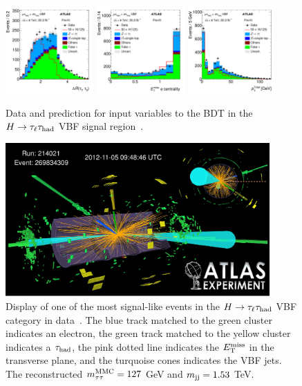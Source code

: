 \begin{figure}[tp]
  \includegraphics[width=0.30\textwidth]{figures/HIGG-2013-32/figaux_06f}
  \includegraphics[width=0.30\textwidth]{figures/HIGG-2013-32/figaux_07a}
  \includegraphics[width=0.30\textwidth]{figures/HIGG-2013-32/figaux_07b}
  \caption{Data and prediction for input variables to the BDT in the $H\rightarrow\tau_\ell\tau_\text{had}$ VBF signal region~\cite{HIGG-2013-32}.}
  \label{fig:results-SR-inputs}
\end{figure}

\clearpage

\begin{figure}[tp]
  \centering
  \includegraphics[width=0.90\textwidth]{figures/HIGG-2013-32/figaux_19}
  \caption{Display of one of the most signal-like events in the $H\rightarrow\tau_\ell\tau_\text{had}$ VBF category in data~\cite{HIGG-2013-32}. The blue track matched to the green cluster indicates an electron, the green track matched to the yellow cluster indicates a $\tau_\text{had}$, the pink dotted line indicates the $E_{\mathrm{T}}^{\mathrm{miss}}$ in the transverse plane, and the turquoise cones indicates the VBF jets. The reconstructed $m_{\tau\tau}^\text{MMC} = 127$ GeV and $m_{\text{jj}} = 1.53$ TeV.}
  \label{fig:results-eventdisplay}
\end{figure}

